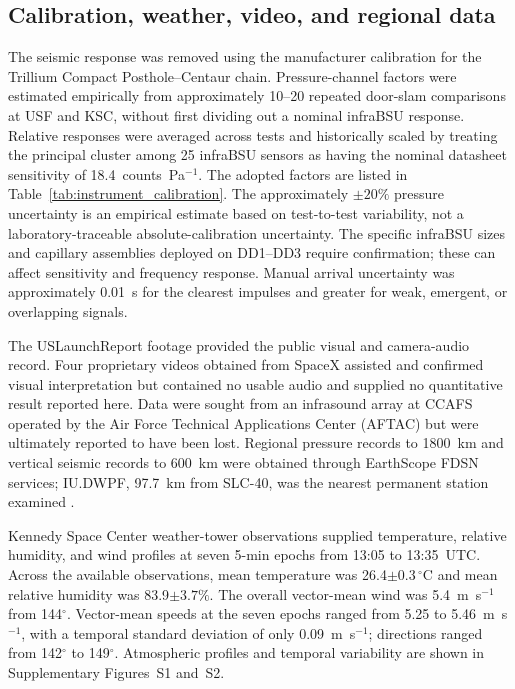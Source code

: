 \documentclass[]{seismica}
\begin{document}
\subsection{Calibration, weather, video, and regional data}

The seismic response was removed using the manufacturer calibration for the
Trillium Compact Posthole--Centaur chain. Pressure-channel factors were
estimated empirically from approximately 10--20 repeated door-slam comparisons
at USF and KSC, without first dividing out a nominal infraBSU response.
Relative responses were averaged across tests and historically scaled by
treating the principal cluster among 25 infraBSU sensors as having the nominal
datasheet sensitivity of 18.4~counts~Pa$^{-1}$. The adopted factors are listed
in Table~\ref{tab:instrument_calibration}. The approximately $\pm20\%$ pressure
uncertainty is an empirical estimate based on test-to-test variability, not a
laboratory-traceable absolute-calibration uncertainty. The specific infraBSU
sizes and capillary assemblies deployed on DD1--DD3 require confirmation;
these can affect sensitivity and frequency response. Manual arrival uncertainty
was approximately 0.01~s for the clearest impulses and greater for weak,
emergent, or overlapping signals.

The USLaunchReport footage provided the public visual and camera-audio record.
Four proprietary videos obtained from SpaceX assisted and confirmed visual
interpretation but contained no usable audio and supplied no quantitative
result reported here. Data were sought from an infrasound array at CCAFS
operated by the Air Force Technical Applications Center (AFTAC)
but were ultimately reported to have been lost. Regional pressure records to 1800~km
and vertical seismic records to 600~km were obtained through EarthScope FDSN
services; IU.DWPF, 97.7~km from SLC-40, was the nearest permanent station
examined \citep{asl_gsn_iu_1988}.

Kennedy Space Center weather-tower observations supplied temperature,
relative humidity, and wind profiles at seven 5-min epochs from 13:05 to
13:35~UTC. Across the available observations, mean temperature was
26.4$\pm0.3\,^{\circ}$C and mean relative humidity was
83.9$\pm3.7\%$. The overall vector-mean wind was 5.4~m~s$^{-1}$ from
144$^\circ$. Vector-mean speeds at the seven epochs ranged from 5.25 to
5.46~m~s$^{-1}$, with a temporal standard deviation of only
0.09~m~s$^{-1}$; directions ranged from 142$^\circ$ to 149$^\circ$.
Atmospheric profiles and temporal variability are shown in Supplementary
Figures~S1 and~S2.
\end{document}
